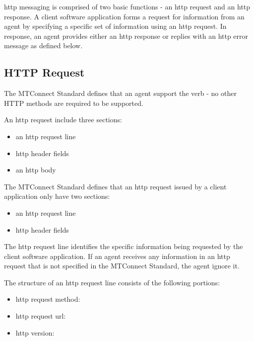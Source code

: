 \documentclass{mtconnect}	%
\begin{document}
\gls{http messaging} is comprised of two basic functions - an \gls{http request} and an \gls{http response}.  A client software application forms a \gls{request} for information from an \gls{agent} by specifying a specific set of information using an \gls{http request}.  In response, an \gls{agent} provides either an \gls{http response} or replies with an \gls{http error message} as defined below. 

\subsection{HTTP Request}

The MTConnect Standard defines that an \gls{agent} \MUST support the  verb - no other HTTP methods are required to be supported.

An \gls{http request} \MAY include three sections:

\begin{itemize}
\item an \gls{http request line}

\item \glspl{http header field}

\item an \gls{http body}
\end{itemize}

The MTConnect Standard defines that an \gls{http request} issued by a client application \SHOULD only have two sections:

\begin{itemize}
\item an \gls{http request line}

\item \glspl{http header field}
\end{itemize}

The \gls{http request line} identifies the specific information being requested by the client software application.  If an \gls{agent} receives any information in an \gls{http request} that is not specified in the MTConnect Standard, the \gls{agent} \MAY ignore it.  

The structure of an \gls{http request line} consists of the following portions:

\begin{itemize}
\item \gls{http request method}: 

\item \gls{http request url}:  

\item \gls{http version}: 
\end{itemize}
\end{document}
